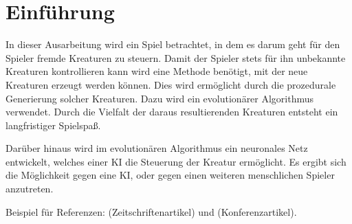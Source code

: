 \documentclass[a4paper,12pt,twoside]{article}
\begin{document}

\tableofcontents
\clearpage



\section{Einführung}

In dieser Ausarbeitung wird ein Spiel betrachtet, in dem es darum geht für den Spieler fremde Kreaturen 
zu steuern. Damit der Spieler stets für ihn unbekannte Kreaturen kontrollieren kann wird eine Methode benötigt, mit der neue Kreaturen erzeugt werden können. Dies wird ermöglicht durch die prozedurale Generierung solcher Kreaturen. Dazu wird ein evolutionärer Algorithmus verwendet. Durch die Vielfalt der daraus resultierenden Kreaturen entsteht ein langfristiger Spielspaß.

Darüber hinaus wird im evolutionären Algorithmus ein neuronales Netz entwickelt, welches einer KI die
Steuerung der Kreatur ermöglicht. Es ergibt sich die Möglichkeit gegen eine KI, oder gegen einen weiteren menschlichen Spieler anzutreten.

Beispiel für Referenzen: \cite{HanKno06} (Zeitschriftenartikel) und \cite{TarekEtAl07} (Konferenzartikel).





\end{document}
